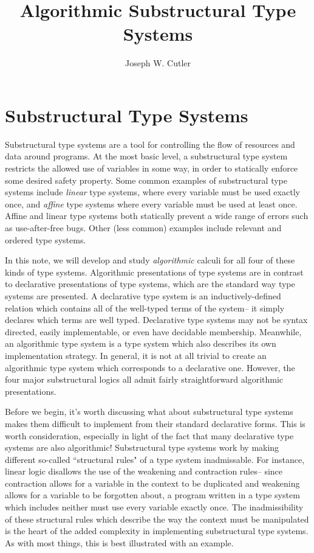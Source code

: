 \documentclass{article}
\author{}
\title{Algorithmic Substructural Type Systems}
\author{Joseph W. Cutler}
\date{ }
\theoremstyle{definition}
\begin{document}
\maketitle


\section{Substructural Type Systems}
Substructural type systems are a tool for controlling the flow of resources and data around programs. At the most basic level, a substructural type system restricts the allowed use of variables in some way, in order to statically enforce some desired safety property. Some common examples of substructural type systems include \textit{linear} type systems, where every variable must be used exactly once, and \textit{affine} type systems where every variable must be used at least once. Affine and linear type systems both statically prevent a wide range of errors such as use-after-free bugs. Other (less common) examples include relevant and ordered type systems. 

In this note, we will develop and study \textit{algorithmic} calculi for all four of these kinds of type systems. Algorithmic presentations of type systems are in contrast to declarative presentations of type systems, which are the standard way type systems are presented. A declarative type system is an inductively-defined relation which contains all of the well-typed terms of the system-- it simply declares which terms are well typed. Declarative type systems may not be syntax directed, easily implementable, or even have decidable membership. Meanwhile, an algorithmic type system is a type system which also describes its own implementation strategy. In general, it is not at all trivial to create an algorithmic type system which corresponds to a declarative one. However, the four major substructural logics all admit fairly straightforward algorithmic presentations.

Before we begin, it's worth discussing what about substructural type systems makes them difficult to implement from their standard declarative forms. This is worth consideration, especially in light of the fact that many declarative type systems are also algorithmic! Substructural type systems work by making different so-called ``structural rules" of a type system inadmissable. For instance, linear logic disallows the use of the weakening and contraction rules-- since contraction allows for a variable in the context to be duplicated and weakening allows for a variable to be forgotten about, a program written in a type system which includes neither must use every variable exactly once. The inadmissibility of these structural rules which describe the way the context must be manipulated is the heart of the added complexity in implementing substructural type systems. As with most things, this is best illustrated with an example.
\end{document}

